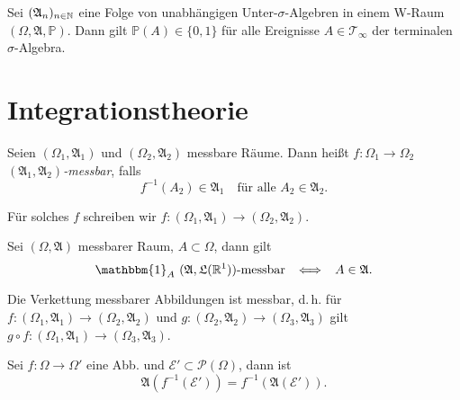 \documentclass{cheat-sheet}
\newcommand{\Alg}{\mathfrak{A}} %
\newcommand{\LebAlg}{\mathfrak{L}} %
\renewcommand{\P}{\mathbb{P}} %
\newcommand{\ind}{\mathbbm{1}} %
\begin{document}

\begin{samepage}

\begin{satz}
  Sei $(\Alg_n)_{n \in \N}$ eine Folge von unabhängigen Unter-$\sigma$-Algebren in einem W-Raum $(\Omega, \Alg, \P)$. Dann gilt $\P(A) \in \{ 0, 1 \}$ für alle Ereignisse $A \in \mathcal{T}_\infty$ der terminalen $\sigma$-Algebra.
\end{satz}


\section{Integrationstheorie}

\end{samepage}


\begin{defn}
  Seien $(\Omega_1, \Alg_1)$ und $(\Omega_2, \Alg_2)$ messbare Räume. Dann heißt $f : \Omega_1 \to \Omega_2$ \emph{$(\Alg_1, \Alg_2)$-messbar}, falls
  \[ f^{-1}(A_2) \in \Alg_1 \quad \text{für alle } A_2 \in \Alg_2. \]
\end{defn}

\begin{nota}
  Für solches $f$ schreiben wir $f : (\Omega_1, \Alg_1) \to (\Omega_2, \Alg_2)$.
\end{nota}

\begin{beobachtung}
  Sei $(\Omega, \Alg)$ messbarer Raum, $A \subset \Omega$, dann gilt
  \[ \ind_A \text{ $(\Alg, \LebAlg(\R^1))$-messbar} \enspace \iff \enspace A \in \Alg. \]
\end{beobachtung}



\begin{lem}
  Die Verkettung messbarer Abbildungen ist messbar, d.\,h. für $f : (\Omega_1, \Alg_1) \to (\Omega_2, \Alg_2)$ und $g : (\Omega_2, \Alg_2) \to (\Omega_3, \Alg_3)$ gilt $g \circ f : (\Omega_1, \Alg_1) \to (\Omega_3, \Alg_3)$.
\end{lem}

\begin{lem}
  Sei $f : \Omega \to \Omega'$ eine Abb. und $\mathcal{E}' \subset \mathcal{P}(\Omega)$, dann ist
  \[ \Alg(f^{-1}(\mathcal{E}')) = f^{-1}(\Alg(\mathcal{E}')). \]
\end{lem}
\end{document}
